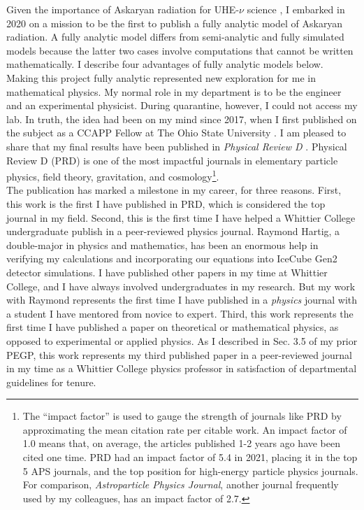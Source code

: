 \documentclass[../../../main.tex]{subfiles}
\begin{document}
Given the importance of Askaryan radiation for UHE-$\nu$ science \cite{Askaryan:1962hbi,1962JPSJS..17C.257A,ask1,ask2,PhysRevLett.86.2802,PhysRevLett.99.171101,PhysRevD.101.083005}, I embarked in 2020 on a mission to be the first to publish a fully analytic model of Askaryan radiation.  A fully analytic model differs from semi-analytic and fully simulated models because the latter two cases involve computations that cannot be written mathematically.  I describe four advantages of fully analytic models below.  Making this project fully analytic represented new exploration for me in mathematical physics.  My normal role in my department is to be the engineer and an experimental physicist.  During quarantine, however, I could not access my lab.  In truth, the idea had been on my mind since 2017, when I first published on the subject as a CCAPP Fellow at The Ohio State University \cite{10.1016/j.astropartphys.2017.03.008}.  I am pleased to share that my final results have been published in \textit{Physical Review D} \cite{PhysRevD.105.123019}.  Physical Review D (PRD) is one of the most impactful journals in elementary particle physics, field theory, gravitation, and cosmology\footnote{The ``impact factor'' is used to gauge the strength of journals like PRD by approximating the mean citation rate per citable work.  An impact factor of 1.0 means that, on average, the articles published 1-2 years ago have been cited one time.  PRD had an impact factor of 5.4 in 2021, placing it in the top 5 APS journals, and the top position for high-energy particle physics journals.  For comparison, \textit{Astroparticle Physics Journal}, another journal frequently used by my colleagues, has an impact factor of 2.7.}.
\\
\vspace{0.15cm}
The publication has marked a milestone in my career, for three reasons.  First, this work is the first I have published in PRD, which is considered the top journal in my field.  Second, this is the first time I have helped a Whittier College undergraduate publish in a peer-reviewed physics journal.  Raymond Hartig, a double-major in physics and mathematics, has been an enormous help in verifying my calculations and incorporating our equations into IceCube Gen2 detector simulations.  I have published other papers in my time at Whittier College, and I have always involved undergraduates in my research.  But my work with Raymond represents the first time I have published in a \textit{physics} journal with a student I have mentored from novice to expert.  Third, this work represents the first time I have published a paper on theoretical or mathematical physics, as opposed to experimental or applied physics.  As I described in Sec. 3.5 of my prior PEGP, this work represents my third published paper in a peer-reviewed journal in my time as a Whittier College physics professor in satisfaction of departmental guidelines for tenure.
\end{document}
